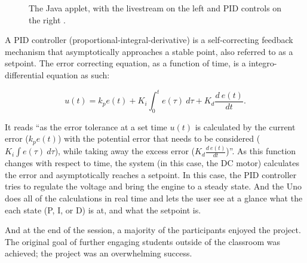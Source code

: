\documentclass[11pt,letterpaper,twocolumn]{article}
\begin{document}
\begin{figure}[!ht]
    \centering
    \caption{The Java applet, with the livestream on the left and PID controls on the right \cite{engineering}.}
\end{figure}

A PID controller (proportional-integral-derivative) is a self-correcting feedback mechanism that asymptotically approaches a stable point, also referred to as a setpoint. The error correcting equation, as a function of time, is a integro-differential equation as such:

\begin{equation}
    u(t) = k_p e(t) + K_i \int _0 ^t e(\tau) \ d\tau + K_d \frac{d \ e(t)}{dt}.
\end{equation}

It reads ``as the error tolerance at a set time $u(t)$ is calculated by the current error ($k_p e(t)$) with the potential error that needs to be considered ($K_i \int e(\tau) \ d\tau$), while taking away the excess error ($K_d \frac{d \ e(t)}{dt}$)''. As this function changes with respect to time, the system (in this case, the DC motor) calculates the error and asymptotically reaches a setpoint. In this case, the PID controller tries to regulate the voltage and bring the engine to a steady state. And the Uno does all of the calculations in real time and lets the user see at a glance what the each state (P, I, or D) is at, and what the setpoint is.

And at the end of the session, a majority of the participants enjoyed the project. The original goal of further engaging students outside of the classroom was achieved; the project was an overwhelming success.
\end{document}
